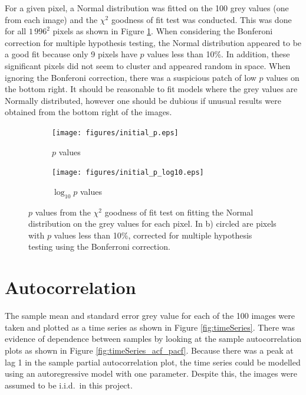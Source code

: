 \documentclass[12pt]{report}
\begin{document}
For a given pixel, a Normal distribution was fitted on the 100 grey values (one from each image) and the $\chi^2$ goodness of fit test was conducted. This was done for all $1\,996^2$ pixels as shown in Figure \ref{fig:initial_fit_normal_test}. When considering the Bonferoni correction \cite{weisstein2004bonferroni} for multiple hypothesis testing, the Normal distribution appeared to be a good fit because only 9 pixels have $p$ values less than 10\%. In addition, these significant pixels did not seem to cluster and appeared random in space. When ignoring the Bonferoni correction, there was a suspicious patch of low $p$ values on the bottom right. It should be reasonable to fit models where the grey values are Normally distributed, however one should be dubious if unusual results were obtained from the bottom right of the images.

\begin{figure}[p]
\centering
	\begin{subfigure}[b]{0.75\textwidth}
		\texttt{[image: figures/initial\_p.eps]}
		\caption{$p$ values}
	\end{subfigure}
	\begin{subfigure}[b]{0.75\textwidth}
		\texttt{[image: figures/initial\_p\_log10.eps]}
		\caption{$\log_{10} p$ values}
	\end{subfigure}
	\caption{$p$ values from the $\chi^2$ goodness of fit test on fitting the Normal distribution on the grey values for each pixel. In b) circled are pixels with $p$ values less than 10\%, corrected for multiple hypothesis testing using the Bonferroni correction.}
	\label{fig:initial_fit_normal_test}
\end{figure}

\section{Autocorrelation}
The sample mean and standard error grey value for each of the 100 images were taken and plotted as a time series as shown in Figure \ref{fig:timeSeries}. There was evidence of dependence between samples by looking at the sample autocorrelation plots as shown in Figure \ref{fig:timeSeries_acf_pacf}. Because there was a peak at lag 1 in the sample partial autocorrelation plot, the time series could be modelled using an autoregressive model with one parameter. Despite this, the images were assumed to be i.i.d.~in this project.
\end{document}
